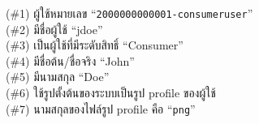 \begin{minipage}{\textwidth}
\begin{description}[labelwidth=*]
    \item[$ \Rightarrow $] (\#1) ผู้ใช้หมายเลข ``\texttt{2000000000001-consumeruser}''\\
(\#2) มีชื่อผู้ใช้ ``jdoe''\\
(\#3) เป็นผู้ใช้ที่มีระดับสิทธิ์ ``Consumer''\\
(\#4) มีชื่อต้น/ชื่อจริง ``John''\\
(\#5) มีนามสกุล ``Doe''\\
(\#6) ใช้รูปตั้งต้นของระบบเป็นรูป profile ของผู้ใช้\\
(\#7) นามสกุลของไฟล์รูป profile คือ ``\texttt{png}''
\end{description}
\end{minipage}


\vspace{3\baselineskip}



